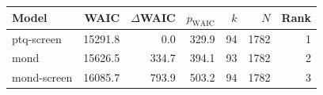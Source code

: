 \begin{tabular}{lrrrrrr}
\toprule
Model & WAIC & $\Delta$WAIC & $p_{\mathrm{WAIC}}$ & $k$ & $N$ & Rank \\
\midrule
ptq-screen & 15291.8 & 0.0 & 329.9 & 94 & 1782 & 1 \\
mond & 15626.5 & 334.7 & 394.1 & 93 & 1782 & 2 \\
mond-screen & 16085.7 & 793.9 & 503.2 & 94 & 1782 & 3 \\
\bottomrule
\end{tabular}
